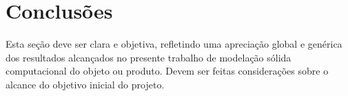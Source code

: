 \cleardoublepage\chapter{Conclusões}

Esta seção deve ser clara e objetiva, refletindo uma apreciação global e
genérica dos resultados alcançados no presente trabalho de modelação sólida
computacional do objeto ou produto. Devem ser feitas considerações sobre o
alcance do objetivo inicial do projeto.
